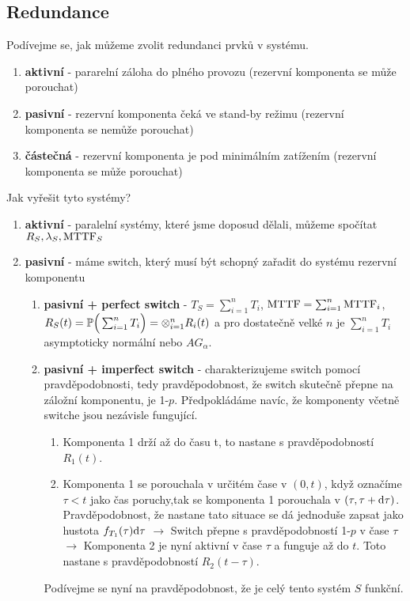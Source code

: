 \subsection{Redundance}
Podívejme se, jak můžeme zvolit redundanci prvků v systému.
	\begin{enumerate}
		\item \textbf{aktivní} - pararelní záloha do plného provozu (rezervní komponenta se může porouchat)
		\item \textbf{pasivní} - rezervní komponenta čeká ve stand-by režimu  (rezervní komponenta se nemůže porouchat)
		\item \textbf{částečná} - rezervní komponenta je pod minimálním zatížením (rezervní komponenta se může porouchat)
		\end{enumerate}
Jak vyřešit tyto systémy? 
	\begin{enumerate}
	\item \textbf{aktivní} - paralelní systémy, které jsme doposud dělali, můžeme spočítat $R_S, \lambda_S , \mathrm{MTTF}_S$
	\item \textbf{pasivní} - máme switch, který musí být schopný zařadit do systému rezervní komponentu 
	\begin{enumerate}
		\item \textbf{pasivní + perfect switch} - $T_S = \sum_{i=1}^n T_i$, $\mathrm{MTTF} = \sum_{i=1}^n \mathrm{MTTF}_i$, $R_S(t) = \mathbb{P}\Big(\sum_{i=1}^n T_i\Big) = \otimes_{i=1}^n R_i(t)$ a pro dostatečně velké $n$ je $\sum_{i=1}^n T_i $ asymptoticky normální nebo $AG_{\alpha}$.
		\item \textbf{pasivní + imperfect switch}  -  charakterizujeme switch pomocí pravděpodobnosti, tedy pravděpodobnost, že switch skutečně přepne na záložní komponentu, je 1-$p$. Předpokládáme navíc, že komponenty včetně switche jsou nezávisle fungující. 
		\begin{enumerate}
			\item Komponenta 1 drží až do času t, to nastane s pravděpodobností $R_1(t)$.
			\item Komponenta 1 se porouchala v určitém čase v $(0,t)$, když označíme $\tau < t$ jako čas poruchy,tak se komponenta 1 porouchala v $(\tau,\tau + \mathrm{d}\tau)$. Pravděpodobnost, že nastane tato situace se dá jednoduše zapsat jako hustota $f_{T_1}(\tau)\mathrm{d}\tau$ $\longrightarrow$ Switch přepne s pravděpodobností 1-$p$ v čase $\tau$ $\longrightarrow$ Komponenta 2 je nyní aktivní v čase $\tau$ a funguje až do $t$. Toto nastane s pravděpodobností $R_2(t-\tau)$.
	\end{enumerate}
Podívejme se nyní na pravděpodobnost, že je celý tento systém $S$ funkční.

\end{enumerate}
\end{enumerate}
